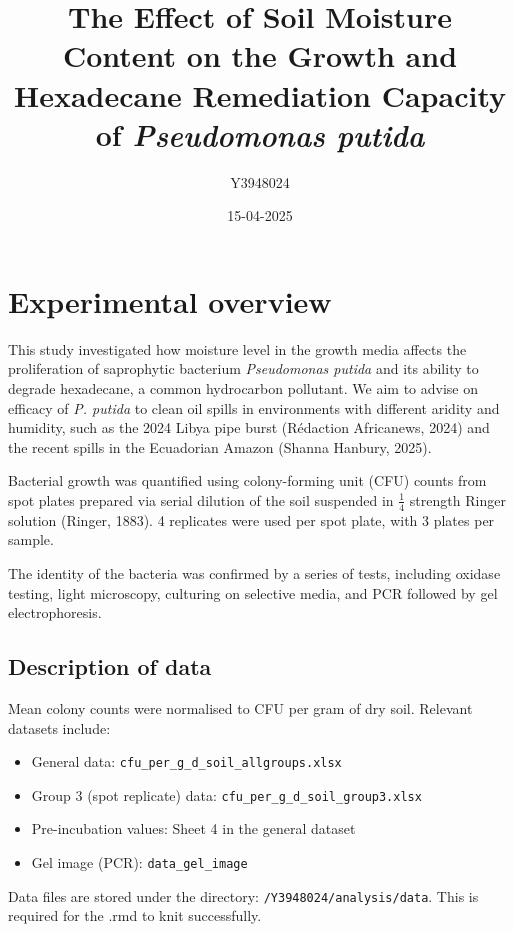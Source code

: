 \documentclass[
]{article}
\title{The Effect of Soil Moisture Content on the Growth and Hexadecane
Remediation Capacity of \emph{Pseudomonas putida}}
\author{Y3948024}
\date{15-04-2025}
\providecommand{\tightlist}{%
  \setlength{\itemsep}{0pt}\setlength{\parskip}{0pt}}
\begin{document}
\maketitle

\section{Experimental overview}\label{experimental-overview}

This study investigated how moisture level in the growth media affects
the proliferation of saprophytic bacterium \emph{Pseudomonas putida} and
its ability to degrade hexadecane, a common hydrocarbon pollutant. We
aim to advise on efficacy of \emph{P. putida} to clean oil spills in
environments with different aridity and humidity, such as the 2024 Libya
pipe burst (Rédaction Africanews, 2024) and the recent spills in the
Ecuadorian Amazon (Shanna Hanbury, 2025).

Bacterial growth was quantified using colony-forming unit (CFU) counts
from spot plates prepared via serial dilution of the soil suspended in
\(\frac{1}{4}\) strength Ringer solution (Ringer, 1883). 4 replicates
were used per spot plate, with 3 plates per sample.

The identity of the bacteria was confirmed by a series of tests,
including oxidase testing, light microscopy, culturing on selective
media, and PCR followed by gel electrophoresis.

\subsection{Description of data}\label{description-of-data}

Mean colony counts were normalised to CFU per gram of dry soil. Relevant
datasets include:

\begin{itemize}
\tightlist
\item
  General data: \texttt{cfu\_per\_g\_d\_soil\_allgroups.xlsx}
\item
  Group 3 (spot replicate) data:
  \texttt{cfu\_per\_g\_d\_soil\_group3.xlsx}
\item
  Pre-incubation values: Sheet 4 in the general dataset
\item
  Gel image (PCR): \texttt{data\_gel\_image}
\end{itemize}

Data files are stored under the directory:
\texttt{/Y3948024/analysis/data}. This is required for the .rmd to knit
successfully.
\end{document}
